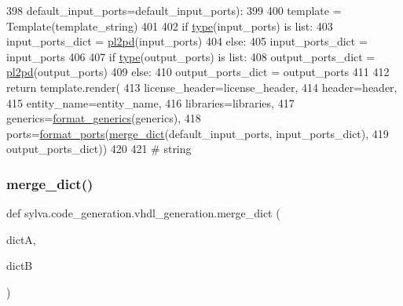 \begin{DoxyCode}
398               default\_input\_ports=default\_input\_ports):
399 
400     template = Template(template\_string)
401 
402     \textcolor{keywordflow}{if} \hyperlink{namespacesylva_1_1misc_1_1exec_a55d55e6d0e68715dfbd883034bd7290c}{type}(input\_ports) \textcolor{keywordflow}{is} list:
403         input\_ports\_dict = \hyperlink{namespacesylva_1_1code__generation_1_1vhdl__generation_a10ea31d6ea98aa308e635b9403f5721f}{pl2pd}(input\_ports)
404     \textcolor{keywordflow}{else}:
405         input\_ports\_dict = input\_ports
406 
407     \textcolor{keywordflow}{if} \hyperlink{namespacesylva_1_1misc_1_1exec_a55d55e6d0e68715dfbd883034bd7290c}{type}(output\_ports) \textcolor{keywordflow}{is} list:
408         output\_ports\_dict = \hyperlink{namespacesylva_1_1code__generation_1_1vhdl__generation_a10ea31d6ea98aa308e635b9403f5721f}{pl2pd}(output\_ports)
409     \textcolor{keywordflow}{else}:
410         output\_ports\_dict = output\_ports
411 
412     \textcolor{keywordflow}{return} template.render(
413         license\_header=license\_header,
414         header=header,
415         entity\_name=entity\_name,
416         libraries=libraries,
417         generics=\hyperlink{namespacesylva_1_1code__generation_1_1vhdl__generation_a94dd1f9bcf57913f20c5a8235e04c3c6}{format\_generics}(generics),
418         ports=\hyperlink{namespacesylva_1_1code__generation_1_1vhdl__generation_ac44fef3535243add66477e8198d8b0a5}{format\_ports}(\hyperlink{namespacesylva_1_1code__generation_1_1vhdl__generation_a6f105e19192ce75934f22be90308ceff}{merge\_dict}(default\_input\_ports, input\_ports\_dict),
419                            output\_ports\_dict))
420 
421 \textcolor{comment}{# string}
\end{DoxyCode}
\mbox{\label{namespacesylva_1_1code__generation_1_1vhdl__generation_a6f105e19192ce75934f22be90308ceff}} 
\subsubsection{\texorpdfstring{merge\+\_\+dict()}{merge\_dict()}}
{\footnotesize\ttfamily def sylva.\+code\+\_\+generation.\+vhdl\+\_\+generation.\+merge\+\_\+dict (\begin{DoxyParamCaption}\item[{}]{dictA,  }\item[{}]{dictB }\end{DoxyParamCaption})}



